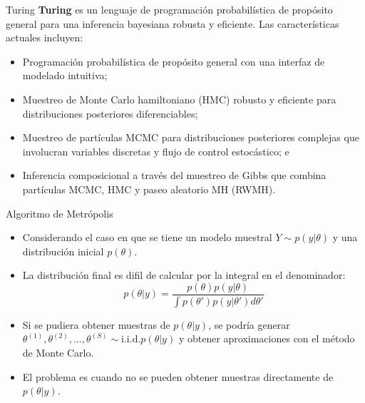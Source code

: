\documentclass[11pt]{beamer}
\begin{document}
\begin{frame}{Turing}
\textbf{Turing} es un lenguaje de programación probabilística de propósito general para una inferencia bayesiana robusta y eficiente. Las características actuales incluyen:

	\begin{itemize}
		\item Programación probabilística de propósito general con una interfaz de modelado intuitiva;
		\item Muestreo de Monte Carlo hamiltoniano (HMC) robusto y eficiente para distribuciones posteriores diferenciables;
		\item 
Muestreo de partículas MCMC para distribuciones posteriores complejas que involucran variables discretas y flujo de control estocástico; e
		\item 
Inferencia composicional a través del muestreo de Gibbs que combina partículas MCMC, HMC y paseo aleatorio MH (RWMH).
	\end{itemize}
\end{frame}


\begin{frame}{Algoritmo de Metrópolis }

\begin{itemize}
	\item Considerando el caso en que se tiene un modelo muestral $Y \sim p(y|\theta)$ y una distribución inicial $p(\theta)$.
	\item La distribución final es difil de calcular por la integral en el denominador:
		 \begin{equation}
		 	p(\theta | y) =  \dfrac{p(\theta)p(y | \theta)}{\int p(\theta{'}) p(y|\theta{'})d\theta{'}}
		 \end{equation}
	\item Si se pudiera obtener muestras de $p(\theta|y)$, se podría generar $\theta^{(1)},\theta^{(2)}, \hdots, \theta^{(S)} \sim \text{i.i.d}. p(\theta | y)$ y obtener aproximaciones con el método de Monte Carlo.
	\item El problema es cuando no se pueden obtener muestras directamente de $p(\theta | y)$.
\end{itemize}
\end{frame}
\end{document}
